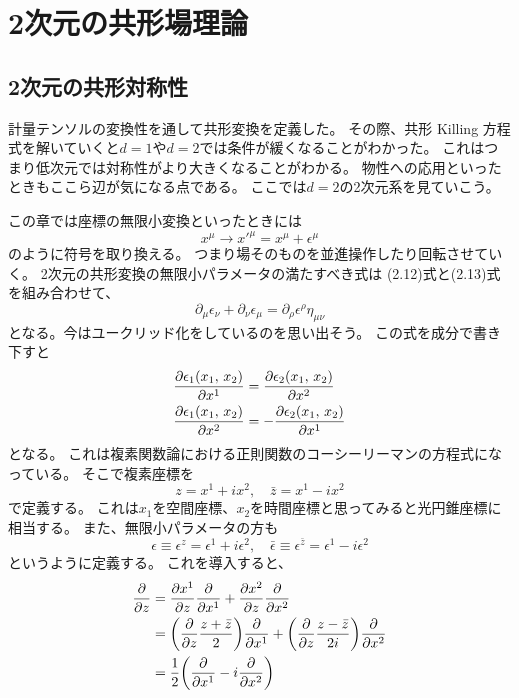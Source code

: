 \documentclass[../../master.tex]{subfiles}
\begin{document}
\setcounter{chapter}{2}
\chapter{2次元の共形場理論}
\section{2次元の共形対称性}
計量テンソルの変換性を通して共形変換を定義した。
その際、共形 Killing 方程式を解いていくと\(d=1\)や\(d=2\)では条件が緩くなることがわかった。
これはつまり低次元では対称性がより大きくなることがわかる。
物性への応用といったときもここら辺が気になる点である。
ここでは\(d=2\)の2次元系を見ていこう。

この章では座標の無限小変換といったときには
\begin{equation*}
    x^\mu \rightarrow x'^\mu = x^\mu + \epsilon^\mu
\end{equation*}
のように符号を取り換える。
つまり場そのものを並進操作したり回転させていく。
2次元の共形変換の無限小パラメータの満たすべき式は
(2.12)式と(2.13)式を組み合わせて、
\begin{equation}
    \partial_\mu \epsilon_\nu + \partial_\nu \epsilon_\mu = \partial_\rho \epsilon^\rho \eta_{\mu\nu}
\end{equation}
となる。今はユークリッド化をしているのを思い出そう。
この式を成分で書き下すと
\begin{align}
    \pdv{\epsilon_1(x_1,\,x_2)}{x^1} &= \pdv{\epsilon_2(x_1,\,x_2)}{x^2} \\
    \pdv{\epsilon_1(x_1,\,x_2)}{x^2} &= -\pdv{\epsilon_2(x_1,\,x_2)}{x^1}
\end{align}
となる。
これは複素関数論における正則関数のコーシーリーマンの方程式になっている。
そこで複素座標を
\begin{equation}
    z = x^1 + ix^2,\quad \bar{z} = x^1 -ix^2
\end{equation}
で定義する。
これは\(x_1\)を空間座標、\(x_2\)を時間座標と思ってみると光円錐座標に相当する。
また、無限小パラメータの方も
\begin{equation}
    \epsilon \equiv \epsilon^z = \epsilon^1 + i\epsilon^2,\quad \bar{\epsilon} \equiv \epsilon^{\bar{z}} = \epsilon^1 - i\epsilon^2
\end{equation}
というように定義する。
これを導入すると、
\begin{align*}
    \pdv{z}
        &= \pdv{x^1}{z}\pdv{x^1} + \pdv{x^2}{z}\pdv{x^2} \\
        &= \qty(\pdv{z} \frac{z+\bar{z}}{2})\pdv{x^1} + \qty(\pdv{z} \frac{z-\bar{z}}{2i})\pdv{x^2}\\
        &= \frac{1}{2}\qty(\pdv{x^1}-i\pdv{x^2})
\end{align*}
\end{document}
